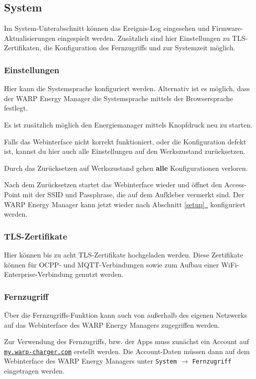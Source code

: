 \documentclass[a4paper,10pt]{article}
\newcommand{\hint}[1]{\begin{tcolorbox}[colback=boxgray,colframe=black,coltext=
white,title=Hinweis,left*=2mm,right*=2mm,boxsep=1mm,bottom=1mm,top=1mm]#1\end{tcolorbox}}
\newcommand*{\fullref}[1]{Abschnitt \hyperref[{#1}]{\ref*{#1}~\nameref*{#1}}}
\newcommand\rurl[2]{%
  \href{#1}{\nolinkurl{#2}}%
}
\begin{document}
\begin{multicols*}{2}
	\subsection{System}
    Im System-Unterabschnitt können das Ereignis-Log eingesehen und Firmware-Aktualisierungen eingespielt werden. Zusätzlich sind hier Einstellungen zu TLS-Zertifikaten, die Konfiguration des Fernzugriffs und zur Systemzeit möglich.
    
    \subsubsection{Einstellungen}
    \label{einstellungen}
    
    Hier kann die Systemsprache konfiguriert werden. Alternativ ist es möglich, dass der WARP Energy Manager
    die Systemsprache mittels der Browsersprache festlegt.
    
    Es ist zusätzlich möglich den Energiemanager mittels Knopfdruck neu zu starten.
    
	Falls das Webinterface nicht korrekt funktioniert, oder die Konfiguration defekt ist,
	kannst du hier auch alle Einstellungen auf den Werkszustand zurücksetzen.
	\hint{Durch das Zurücksetzen auf Werkszustand gehen \mbox{\textbf{alle}} Konfigurationen verloren.}
	Nach dem Zurücksetzen startet das Webinterface wieder und öffnet
	den Access-Point mit der SSID und Passphrase, die auf dem Aufkleber vermerkt
	sind. Der WARP Energy Manager kann jetzt wieder nach \fullref{setup} konfiguriert werden.
    
    
    \subsubsection{TLS-Zertifikate}
    Hier können bis zu acht TLS-Zertifikate hochgeladen werden. Diese Zertifikate können
    für OCPP- und MQTT-Verbindungen sowie zum Aufbau einer WiFi-Enterprise-Verbindung genutzt werden.
    
    \subsubsection{Fernzugriff}

    Über die Fernzugriffs-Funktion kann auch von außerhalb des eigenen Netzwerks auf das Webinterface des WARP Energy Managers zugegriffen werden.

    Zur Verwendung des Fernzugriffs, bzw. der Apps muss zunächst ein Account auf \rurl{https://my.warp-charger.com}{my.warp-charger.com} erstellt werden. Die Account-Daten müssen dann auf dem Webinterface des WARP Energy Managers unter \texttt{System} $\rightarrow$ \texttt{Fernzugriff} eingetragen werden.


\end{multicols*}
\end{document}
